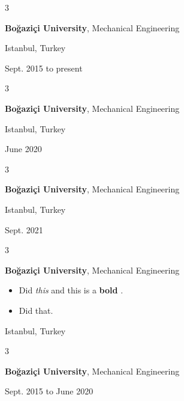 \documentclass[10pt, letterpaper]{article}
\newenvironment{highlights}{
    \begin{itemize}[
        topsep=0.10 cm,
        parsep=0.10 cm,
        partopsep=0pt,
        itemsep=0pt,
        leftmargin=0.4 cm + 10pt
    ]
}{
    \end{itemize}
            
    \vspace{-0.10cm}
} %
\newenvironment{threecolentry}[3][]{
    \onecolentry
    \def\thirdColumn{#3}
    \setcolumnwidth{1cm, \fill, 4.1 cm}
    \begin{paracol}{3}
    \raggedright #2 \switchcolumn
}{
    \switchcolumn \raggedleft \thirdColumn
    \end{paracol}
    \endonecolentry
} %
\let\hrefWithoutArrow\href
\renewcommand{\href}[2]{\hrefWithoutArrow{#1}{\mbox{\ifthenelse{\equal{#2}{}}{ }{#2 }\raisebox{.15ex}{\footnotesize \faExternalLink*}}}}
\begin{document}
        \vspace{0.2 cm}

        \begin{threecolentry}{\textbf{}}{
            Istanbul, Turkey

        Sept. 2015 to present
        }
            \textbf{Boğaziçi University}, Mechanical Engineering
        \end{threecolentry}

        \vspace{0.2 cm}

        \begin{threecolentry}{\textbf{}}{
            Istanbul, Turkey

        June 2020
        }
            \textbf{Boğaziçi University}, Mechanical Engineering
        \end{threecolentry}

        \vspace{0.2 cm}

        \begin{threecolentry}{\textbf{}}{
            Istanbul, Turkey

        Sept. 2021
        }
            \textbf{Boğaziçi University}, Mechanical Engineering
        \end{threecolentry}

        \vspace{0.2 cm}

        \begin{threecolentry}{\textbf{}}{
            Istanbul, Turkey
        }
            \textbf{Boğaziçi University}, Mechanical Engineering
            \begin{highlights}
                \item Did \textit{this} and this is a \textbf{bold} \href{https://example.com}{link}.
                \item Did that.
            \end{highlights}
        \end{threecolentry}

        \vspace{0.2 cm}

        \begin{threecolentry}{\textbf{}}{
            Sept. 2015 to June 2020
        }
            \textbf{Boğaziçi University}, Mechanical Engineering
        \end{threecolentry}

        \vspace{0.2 cm}
\end{document}
